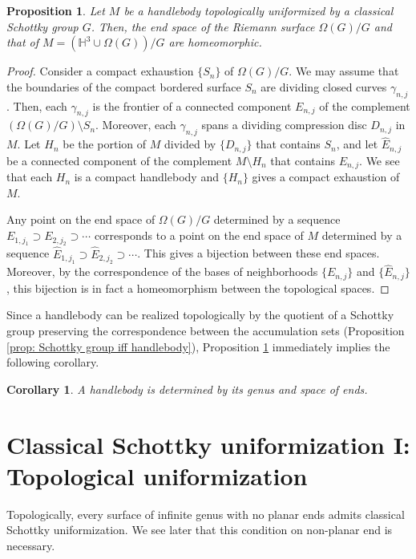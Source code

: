 \documentclass[12pt]{amsart}
\theoremstyle{plain}
\newtheorem{cor}[thm]{Corollary}
\newtheorem{prop}[thm]{Proposition}
\begin{document}
\begin{prop} \label{prop: end space same}
Let $M$ be a handlebody topologically uniformized by a classical Schottky group $G$. 
Then, the end space of the Riemann surface $\Omega(G)/G$ and that of $M = (\mathbb H^3 \cup \Omega(G))/G$ are homeomorphic. 
\end{prop}



\begin{proof}
Consider a compact exhaustion $\{S_n\}$ of $\Omega(G)/G$.
We may assume that the boundaries of the compact bordered surface $S_n$ are dividing closed curves $\gamma_{n,j}$.
Then, each $\gamma_{n,j}$ is the frontier of a connected component $E_{n,j}$ of the complement $(\Omega(G)/G) \setminus S_n$.
Moreover, each $\gamma_{n,j}$ spans a dividing compression disc $D_{n,j}$ in $M$. Let $H_n$ be
the portion of $M$ divided by $\{D_{n,j}\}$ that contains $S_n$, and let
$\widehat E_{n,j}$ be a connected component of the complement $M \setminus H_n$ 
that contains $E_{n,j}$.
We see that each $H_n$ is a compact handlebody and $\{H_n\}$ gives a compact exhaustion of 
$M$.

Any point on the end space of $\Omega(G)/G$ determined by a sequence $E_{1,j_1} \supset E_{2,j_2} \supset \cdots$
corresponds to a point on the end space of $M$ determined 
by a sequence $\widehat E_{1,j_1} \supset \widehat E_{2,j_2} \supset \cdots$. This gives a bijection between these end spaces.
Moreover, by the correspondence of the bases of neighborhoods $\{E_{n,j}\}$ and $\{\widehat E_{n,j}\}$,
this bijection is in fact a homeomorphism between the topological spaces.
\end{proof}

Since a handlebody can be realized topologically by the quotient of a Schottky group 
preserving the correspondence between the accumulation sets (Proposition \ref{prop: Schottky group iff handlebody}), Proposition \ref{prop: end space same} immediately implies the following corollary. 

\begin{cor} \label{cor: handlebody determined}
A handlebody is determined by its genus and space of ends. 
\end{cor}






\section{Classical Schottky uniformization I: Topological uniformization}\label{sec: uniformization I}
Topologically, every surface of infinite genus with no planar ends admits
classical Schottky uniformization. We see later that this condition on non-planar end is necessary.
\end{document}
